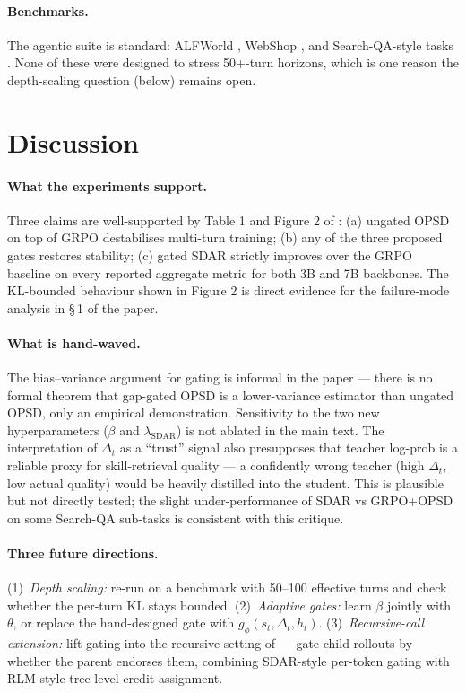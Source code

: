 \documentclass[11pt]{article}
\begin{document}
\paragraph{Benchmarks.} The agentic suite is standard:
ALFWorld \citep{shridhar2020alfworld}, WebShop
\citep{yao2022webshop}, and Search-QA-style tasks
\citep{searchqa2017}. None of these were designed to stress 50+-turn
horizons, which is one reason the depth-scaling question (below)
remains open.

\section*{Discussion}

\paragraph{What the experiments support.} Three claims are well-supported
by Table 1 and Figure 2 of \citet{lu2026sdar}: (a) ungated OPSD on top of
GRPO destabilises multi-turn training; (b) any of the three proposed
gates restores stability; (c) gated SDAR strictly improves over the GRPO
baseline on every reported aggregate metric for both 3B and 7B
backbones. The KL-bounded behaviour shown in Figure 2 is direct evidence
for the failure-mode analysis in \S\,1 of the paper.

\paragraph{What is hand-waved.} The bias--variance argument for gating
is informal in the paper --- there is no formal theorem that
gap-gated OPSD is a lower-variance estimator than ungated OPSD, only an
empirical demonstration. Sensitivity to the two new hyperparameters
($\beta$ and $\lambda_{\mathrm{SDAR}}$) is not ablated in the main text.
The interpretation of $\Delta_t$ as a ``trust'' signal also presupposes
that teacher log-prob is a reliable proxy for skill-retrieval quality
--- a confidently wrong teacher (high $\Delta_t$, low actual quality)
would be heavily distilled into the student. This is plausible but not
directly tested; the slight under-performance of SDAR vs GRPO+OPSD on
some Search-QA sub-tasks is consistent with this critique.

\paragraph{Three future directions.}
(1)~\emph{Depth scaling:} re-run on a benchmark with 50--100 effective
turns and check whether the per-turn KL stays bounded. (2)~\emph{Adaptive
gates:} learn $\beta$ jointly with $\theta$, or replace the
hand-designed gate with $g_\phi(s_t, \Delta_t, h_t)$. (3)~\emph{Recursive-call
extension:} lift gating into the recursive setting of \citet{rlm2026}
--- gate child rollouts by whether the parent endorses them, combining
SDAR-style per-token gating with RLM-style tree-level credit
assignment.
\end{document}

